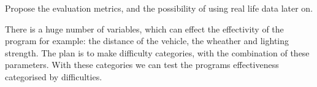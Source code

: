 Propose the evaluation metrics, and the possibility of using real life data
later on.

There is a huge number of variables, which can effect the effectivity of the program for example:
the distance of the vehicle, the wheather and lighting strength. The plan is to make difficulty categories, with the combination
of these parameters. With these categories we can test the programs effectiveness categorised by difficulties.